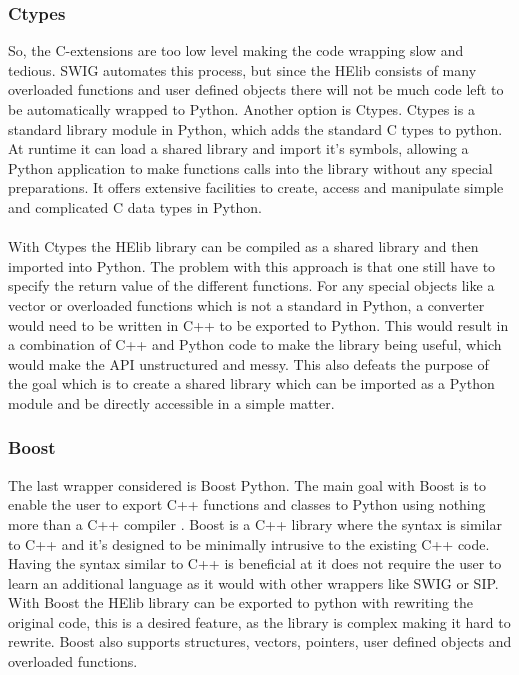 \subsubsection{Ctypes}
So, the C-extensions are too low level making the code wrapping slow and tedious. SWIG automates this process, but since the HElib consists of many overloaded functions and user defined objects there will not be much code left to be automatically wrapped to Python. Another option is Ctypes. Ctypes is a standard library module in Python, which adds the standard C types to python. At runtime it can load a shared library and import it's symbols, allowing a Python application to make functions calls into the library without any special preparations. It offers extensive facilities to create, access and manipulate simple and complicated C data types in Python. \\\\
With Ctypes the HElib library can be compiled as a shared library and then imported into Python. The problem with this approach is that one still have to specify the return value of the different functions. For any special objects like a vector or overloaded functions which is not a standard in Python, a converter would need to be written in C++ to be exported to Python. This would result in a combination of C++ and Python code to make the library being useful, which would make the API unstructured and messy. This also defeats the purpose of the goal which is to create a shared library which can be imported as a Python module and be directly accessible in a simple matter.

\subsubsection{Boost}
The last wrapper considered is Boost Python. The main goal with Boost is to enable the user to export C++ functions and classes to Python using nothing more than a C++ compiler \cite{abrahams2003building}. Boost is a C++ library where the syntax is similar to C++ and it's designed to be minimally intrusive to the existing C++ code. Having the syntax similar to C++ is beneficial at it does not require the user to learn an additional language as it would with other wrappers like SWIG or SIP. With Boost the HElib library can be exported to python with rewriting the original code, this is a desired feature, as the library is complex making it hard to rewrite. Boost also supports structures, vectors, pointers, user defined objects and overloaded functions.

